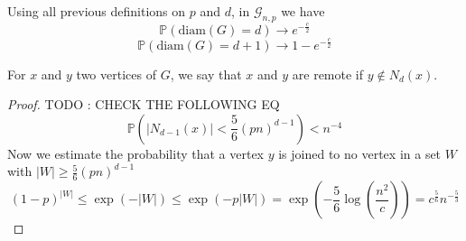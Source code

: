 \begin{theorem}
	Using all previous definitions on $p$ and $d$, in $\mathcal{G}_{n, p}$ we have
	\begin{equation}
		\mathbb{P}(\text{diam}(G) = d) \longrightarrow e^{-\frac{c}{2}}
	\end{equation}	
	\begin{equation}
		\mathbb{P}(\text{diam}(G) = d + 1) \longrightarrow 1 - e^{-\frac{c}{2}}
	\end{equation}
\end{theorem}
\begin{definition}
	For $x$ and $y$ two vertices of $G$, we say that $x$ and $y$ are remote if $y \not\in N_d(x)$.
\end{definition}
\begin{proof}
	TODO : CHECK THE FOLLOWING EQ
	\begin{equation}
		\mathbb{P}(|N_{d-1}(x)| < \frac{5}{6}(pn)^{d-1}) < n^{-4}
	\end{equation}
	Now we estimate the probability that a vertex $y$ is joined to no vertex in a set $W$ with $|W| \geq \frac{5}{6}(pn)^{d-1}$
	\begin{equation}
	(1-p)^{|W|} \leq \exp(-|W|) \leq \exp(-p|W|) = \exp(-\frac{5}{6}\log(\frac{n^2}{c})) = c^{\frac{5}{6}}n^{-\frac{5}{3}}
	\end{equation}


\end{proof}

